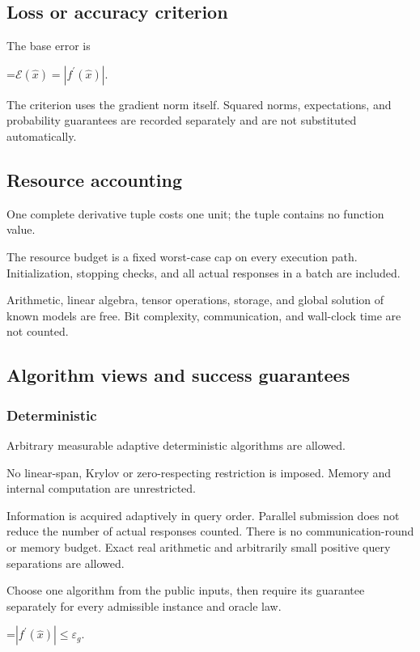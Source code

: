 \documentclass[10pt,a4paper]{article}
\newcommand{\AtlasMath}[1]{\par\begingroup\centering\setbox0=\hbox{$\displaystyle #1$}\ifdim\wd0>1.4\linewidth\typeout{ATLAS WIDE FORMULA: \the\wd0}\fi\ifdim\wd0>\linewidth\resizebox{\linewidth}{!}{\box0}\else\box0\fi\par\endgroup}
\begin{document}
\subsection{Loss or accuracy criterion}
The base error is


\AtlasMath{\mathcal{E}(\widehat{x})=|f^{\prime}(\widehat{x})|.}


The criterion uses the gradient norm itself. Squared norms, expectations, and probability guarantees are recorded separately and are not substituted automatically.

\subsection{Resource accounting}
One complete derivative tuple costs one unit; the tuple contains no function value.

The resource budget is a fixed worst-case cap on every execution path. Initialization, stopping checks, and all actual responses in a batch are included.

Arithmetic, linear algebra, tensor operations, storage, and global solution of known models are free. Bit complexity, communication, and wall-clock time are not counted.

\subsection{Algorithm views and success guarantees}
\subsubsection{Deterministic}
Arbitrary measurable adaptive deterministic algorithms are allowed.

No linear-span, Krylov or zero-respecting restriction is imposed. Memory and internal computation are unrestricted.

Information is acquired adaptively in query order. Parallel submission does not reduce the number of actual responses counted. There is no communication-round or memory budget. Exact real arithmetic and arbitrarily small positive query separations are allowed.

Choose one algorithm from the public inputs, then require its guarantee separately for every admissible instance and oracle law.


\AtlasMath{|f^{\prime}(\widehat{x})|\le \varepsilon_g.}
\end{document}
